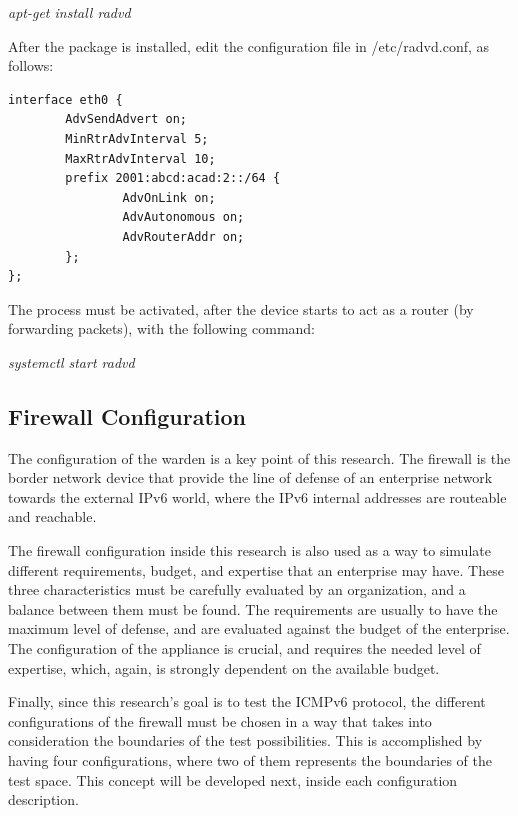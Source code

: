 \documentclass[12pt]{article}
\begin{document}
\vspace{-15pt}
\textit{apt-get install radvd}

\vspace{-10pt}
After the package is installed, edit the configuration file in /etc/radvd.conf, as follows:

\begin{lstlisting}[style=python,basicstyle=\ttfamily\scriptsize]
 interface eth0 { 
        AdvSendAdvert on;
        MinRtrAdvInterval 5; 
        MaxRtrAdvInterval 10;
        prefix 2001:abcd:acad:2::/64 { 
                AdvOnLink on; 
                AdvAutonomous on; 
                AdvRouterAddr on; 
        };
};
\end{lstlisting}
\vspace{-15pt}
The process must be activated, after the device starts to act as a router (by forwarding packets), with the following command:

\vspace{-15pt}
\textit{systemctl start radvd}


\subsection{Firewall Configuration}
\label{subsection:firewallConf}

The configuration of the warden is a key point of this research. The firewall is the border network device that provide the line of defense of an enterprise network towards the external IPv6 world, where the IPv6 internal addresses are routeable and reachable.

The firewall configuration inside this research is also used as a way to simulate different requirements, budget, and expertise that an enterprise may have. These three characteristics must be carefully evaluated by an organization, and a balance between them must be found. The requirements are usually to have the maximum level of defense, and are evaluated against the budget of the enterprise. The configuration of the appliance is crucial, and requires the needed level of expertise, which, again, is strongly dependent on the available budget.

Finally, since this research's goal is to test the ICMPv6 protocol, the different configurations of the firewall must be chosen in a way that takes into consideration the boundaries of the test possibilities. This is accomplished by having four configurations, where two of them represents the boundaries of the test space. This concept will be developed next, inside each configuration description.
\end{document}

